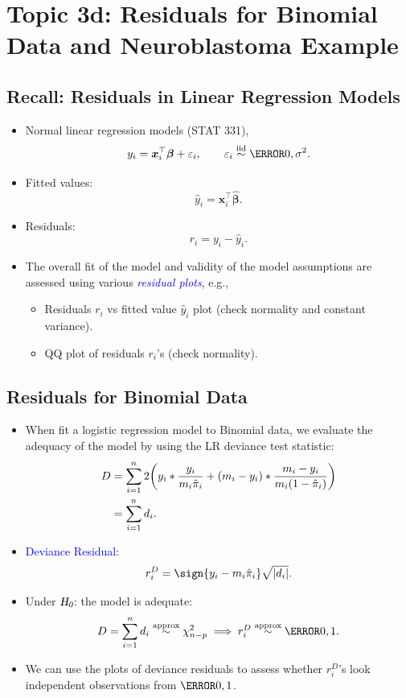 \documentclass[oneside]{book}\usepackage[]{graphicx}\usepackage[svgnames]{xcolor}
\let\log\relax%
\newcommand{\HN}{\textsl{H}_{\textsl{0}}}%
\newcommand{\iid}{\overset{\text{iid}}{\sim}}%
\DeclarePairedDelimiter\abs{\lvert}{\rvert}
\providecommand{\Vector}[1]{\bm{#1}}%
\newcommand{\makeheading}[2]%
{%
\begin{center}%
    \makebox[\linewidth]{\raisebox{-.5ex}[0cm][0cm]{\stackanchor{\textcolor{Gray}{\textsc{#1}}}{\scriptsize\itshape\printyearoff#2}\;}\color{Crimson!50}\hrulefill}%
\end{center}%
}%
\begin{document}
\makeheading{Week 5}{\daterange{2021-10-03}{2021-10-08}}
\section*{Topic 3d: Residuals for Binomial Data and Neuroblastoma Example}
\subsection*{Recall: Residuals in Linear Regression Models}
\begin{itemize}
    \item Normal linear regression models (STAT 331),
          \[ y_i=\Vector{x}_i^\top \Vector{\beta}+\varepsilon_i,\qquad \varepsilon_i\iid\N{0,\sigma^2}. \]
    \item Fitted values:
          \[ \hat{y}_i=\Vector{x}_i^\top \hat{\Vector{\beta}}. \]
    \item Residuals:
          \[ r_i=y_i-\hat{y}_i. \]
    \item The overall fit of the model and validity of the model assumptions are assessed using various \textcolor{Blue}{\emph{residual plots}},
          e.g.,
          \begin{itemize}
              \item Residuals $ r_i $ vs fitted value $ \hat{y}_i $ plot (check normality and constant variance).
              \item QQ plot of residuals $ r_i $'s (check normality).
          \end{itemize}
\end{itemize}
\subsection*{Residuals for Binomial Data}
\begin{itemize}
    \item When fit a logistic regression model to Binomial data, we evaluate the adequacy of the model by using the LR deviance test statistic:
          \begin{align*}
              D
               & =\sum_{i=1}^{n} 2\biggl(y_i\log*{\frac{y_i}{m_i\hat{\pi}_i}}+(m_i-y_i)\log*{\frac{m_i-y_i}{m_i(1-\hat{\pi}_i)}}\biggr) \\
               & =\sum_{i=1}^{n} d_i.
          \end{align*}
    \item \textcolor{Blue}{Deviance Residual}:
          \[ r_i^D=\sign{y_i-m_i\hat{\pi}_i}\sqrt{\abs{d_i}}. \]
    \item Under $ \HN $: the model is adequate:
          \[ D=\sum_{i=1}^{n} d_i\stackrel{\text{approx}}{\sim}\chi^2_{n-p}\implies r_i^D\stackrel{\text{approx}}{\sim}\N{0,1}. \]
    \item We can use the plots of deviance residuals to assess whether $ r_i^D $'s look independent observations from $ \N{0,1} $.
\end{itemize}
\end{document}
